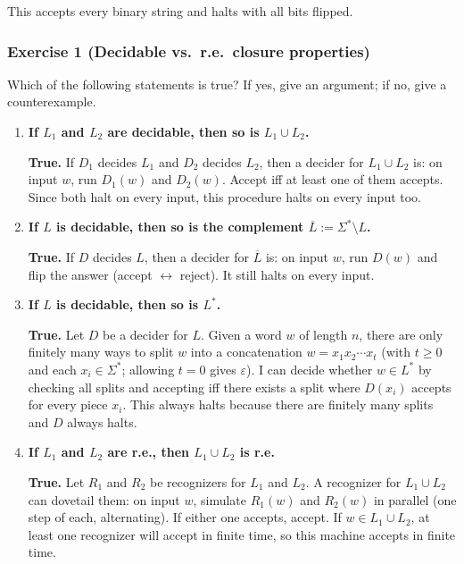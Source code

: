 \documentclass{article}
\theoremstyle{theorem}
\theoremstyle{definition}
\theoremstyle{remark}
\begin{document}
This accepts every binary string and halts with all bits flipped.

\subsubsection*{Exercise 1 (Decidable vs.\ r.e.\ closure properties)}
Which of the following statements is true? If yes, give an argument; if no, give a counterexample.

\begin{enumerate}
  \item \textbf{If $L_1$ and $L_2$ are decidable, then so is $L_1 \cup L_2$.}
  
  \textbf{True.} If $D_1$ decides $L_1$ and $D_2$ decides $L_2$, then a decider for $L_1 \cup L_2$ is: on input $w$, run $D_1(w)$ and $D_2(w)$. Accept iff at least one of them accepts. Since both halt on every input, this procedure halts on every input too.
  
  \item \textbf{If $L$ is decidable, then so is the complement $\overline{L} := \Sigma^* \setminus L$.}
  
  \textbf{True.} If $D$ decides $L$, then a decider for $\overline{L}$ is: on input $w$, run $D(w)$ and flip the answer (accept $\leftrightarrow$ reject). It still halts on every input.
  
  \item \textbf{If $L$ is decidable, then so is $L^*$.}
  
  \textbf{True.} Let $D$ be a decider for $L$. Given a word $w$ of length $n$, there are only finitely many ways to split $w$ into a concatenation $w = x_1 x_2 \cdots x_t$ (with $t \ge 0$ and each $x_i \in \Sigma^*$; allowing $t=0$ gives $\varepsilon$). I can decide whether $w \in L^*$ by checking all splits and accepting iff there exists a split where $D(x_i)$ accepts for every piece $x_i$. This always halts because there are finitely many splits and $D$ always halts.
  
  \item \textbf{If $L_1$ and $L_2$ are r.e., then $L_1 \cup L_2$ is r.e.}
  
  \textbf{True.} Let $R_1$ and $R_2$ be recognizers for $L_1$ and $L_2$. A recognizer for $L_1 \cup L_2$ can dovetail them: on input $w$, simulate $R_1(w)$ and $R_2(w)$ in parallel (one step of each, alternating). If either one accepts, accept. If $w \in L_1 \cup L_2$, at least one recognizer will accept in finite time, so this machine accepts in finite time.
  

\end{enumerate}
\end{document}
